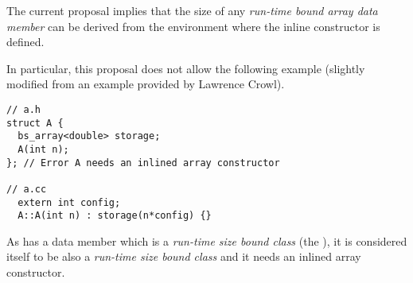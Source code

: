 The current proposal implies that the size of any \emph{run-time bound array
data member} can be derived from the environment where the inline constructor is
defined.

In particular, this proposal does not allow the following example (slightly
modified from an example provided by Lawrence Crowl).

\begin{lstlisting}
// a.h
struct A {
  bs_array<double> storage;
  A(int n);
}; // Error A needs an inlined array constructor

// a.cc
  extern int config;
  A::A(int n) : storage(n*config) {}
\end{lstlisting}

As   has a data member which is a \emph{run-time size bound class}
(the ), it is considered itself to be also a \emph{run-time size
bound class} and it needs an inlined array constructor.

